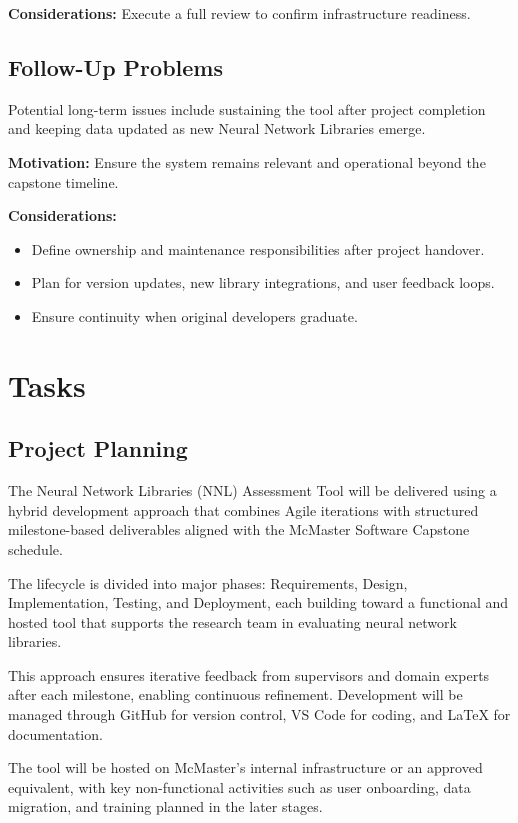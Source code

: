 \documentclass[12pt]{article}
\begin{document}
\textbf{Considerations:} Execute a full review to confirm infrastructure readiness.

\subsection{Follow-Up Problems}

Potential long-term issues include sustaining the tool after project completion and keeping data updated as new Neural Network Libraries emerge.

\textbf{Motivation:} Ensure the system remains relevant and operational beyond the capstone timeline.

\textbf{Considerations:}
\begin{itemize}
    \item Define ownership and maintenance responsibilities after project handover.
    \item Plan for version updates, new library integrations, and user feedback loops.
    \item Ensure continuity when original developers graduate.
\end{itemize}


\section{Tasks}

\subsection{Project Planning}

The Neural Network Libraries (NNL) Assessment Tool will be delivered using a hybrid development approach that combines Agile iterations with structured milestone-based deliverables aligned with the McMaster Software Capstone schedule.

The lifecycle is divided into major phases: Requirements, Design, Implementation, Testing, and Deployment, each building toward a functional and hosted tool that supports the research team in evaluating neural network libraries.

This approach ensures iterative feedback from supervisors and domain experts after each milestone, enabling continuous refinement. Development will be managed through GitHub for version control, VS Code for coding, and LaTeX for documentation.

The tool will be hosted on McMaster’s internal infrastructure or an approved equivalent, with key non-functional activities such as user onboarding, data migration, and training planned in the later stages.
\end{document}

